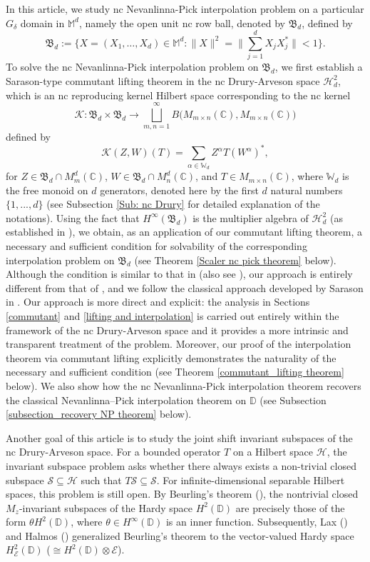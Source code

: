 \documentclass[12pt]{amsart}%
\numberwithin{equation}{section}
\newcommand{\bC}{\mathbb{C}}
\newcommand{\bM}{\mathbb{M}}
\newcommand{\bW}{\mathbb{W}}
\newcommand{\fB}{{\mathfrak{B}}}
\newcommand{\cle}{\mathcal{E}}
\newcommand{\clh}{\mathcal{H}}
\newcommand{\clk}{\mathcal{K}}
\newcommand{\cls}{\mathcal{S}}
\newcommand{\D}{\mathbb{D}}
\newcommand{\C}{\mathbb{C}}
\begin{document}
In this article, we study nc Nevanlinna-Pick interpolation problem on a particular $G_\delta$ domain in $\bM^d$, namely the open unit nc row ball, denoted by $\fB_d$, defined by
\[
\fB_d:=\Big\{X=(X_1,\ldots,X_d)\in\bM^{d}:\|X\|^2=\Big\|\sum_{j=1}^dX_jX_j^*\Big\| <1\Big\}.
\] 
To solve the nc Nevanlinna-Pick interpolation problem on $\fB_d$, we first establish a Sarason-type commutant lifting theorem in the nc Drury-Arveson space $\clh_d^2$, which is an nc reproducing kernel Hilbert space corresponding to the nc kernel 
\[
   \clk:\fB_d\times\fB_d\to\bigsqcup_{m,n=1}^{\infty} B\big(M_{m\times n}(\bC), M_{m\times n}(\bC)\big) 
    \]
    defined by
    \[
   \clk(Z,W)(T)=\sum_{\alpha\in \bW_d}Z^{\alpha}T(W^{\alpha})^*,
    \]
     for $Z\in\fB_d\cap M_m^d(\C)$, $W\in \fB_d\cap M_n^d(\C)$, and $T\in M_{m\times n}(\bC)$, where $\bW_d$ is the free monoid on $d$ generators, denoted here by the first $d$ natural numbers $\{1,...,d\}$ (see Subsection \ref{Sub: nc Drury} for detailed explanation of the notations). Using the fact that $H^{\infty}(\fB_d)$ is the multiplier algebra of $\clh_d^2$ (as established in \cite{BMV18, SSS}), we obtain, as an application of our commutant lifting theorem,  a necessary and sufficient condition for solvability of the corresponding interpolation problem on $\fB_d$ (see Theorem \ref{Scaler nc pick theorem} below). Although the condition is similar to that in \cite{BMV18} (also see \cite{AJP}), our approach is entirely different from that of \cite{BMV18}, and we follow the classical approach developed by Sarason in \cite{S}. Our approach is more direct and explicit: the analysis in Sections \ref{commutant} and \ref{lifting and interpolation} is carried out entirely within the framework of the nc Drury-Arveson space and it provides a more intrinsic and transparent treatment of the problem. Moreover, our proof of the interpolation theorem via commutant lifting explicitly demonstrates the naturality of the necessary and sufficient condition (see Theorem \ref{commutant_lifting theorem} below). We also show how the nc Nevanlinna-Pick interpolation theorem recovers the classical Nevanlinna–Pick interpolation theorem on $\mathbb{D}$ (see Subsection \ref{subsection_recovery NP theorem} below).

     Another goal of this article is to study the joint shift invariant subspaces of the nc Drury-Arveson space. For a bounded operator $T$ on a Hilbert space $\clh$, the invariant subspace problem asks whether there always exists a non-trivial closed subspace $\cls\subseteq \clh$ such that $T\cls\subseteq \cls$. For infinite-dimensional separable Hilbert spaces, this problem is still open. By Beurling’s theorem (\cite{Beur}), the nontrivial closed $M_z$-invariant subspaces of the Hardy space $H^2(\D)$ are precisely those of the form $\theta H^2(\D)$, where $\theta\in H^\infty(\D)$ is an inner function. Subsequently, Lax (\cite{Lax}) and Halmos (\cite{Halmos}) generalized Beurling's theorem to the vector-valued Hardy space $H_{\cle}^2(\D)$ ($\cong H^2(\D)\otimes \cle$).
\end{document}
